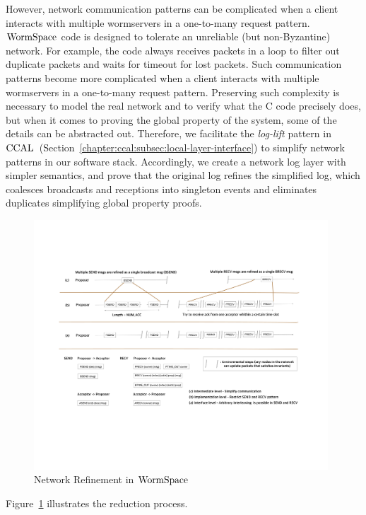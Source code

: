 However, network communication patterns can be complicated when a client interacts with multiple wormservers in a one-to-many request pattern.
$\mathrm{WormSpace}$ code is designed to tolerate an unreliable (but non-Byzantine) network. 
For example, the code always receives packets in a loop to filter out duplicate packets and waits for timeout for lost packets. 
Such communication patterns become more complicated when a client interacts with multiple wormservers in a one-to-many request pattern.
Preserving such complexity is necessary to model the real network and to verify what the C code precisely does,
but when it comes to proving the global property of the system, some of the details can be abstracted out.
Therefore, we facilitate the  \textit{log-lift} pattern in $\mathrm{CCAL}$~(Section~\ref{chapter:ccal:subsec:local-layer-interface}) 
to simplify network patterns in our software stack. 
Accordingly, we create a network log layer with simpler semantics, and prove that the original log refines the simplified log, 
which coalesces broadcasts and receptions into singleton events and eliminates duplicates simplifying global property proofs.
\begin{figure}
\begin{center}
\includegraphics[width=0.98\textwidth]{figs/multipaxos/wormspace_network_refine}
\end{center}
\caption{Network Refinement in $\mathrm{WormSpace}$}
\label{fig:chapter:multipaxos:network-refinement}
\end{figure}
Figure~\ref{fig:chapter:multipaxos:network-refinement} illustrates the reduction process.
